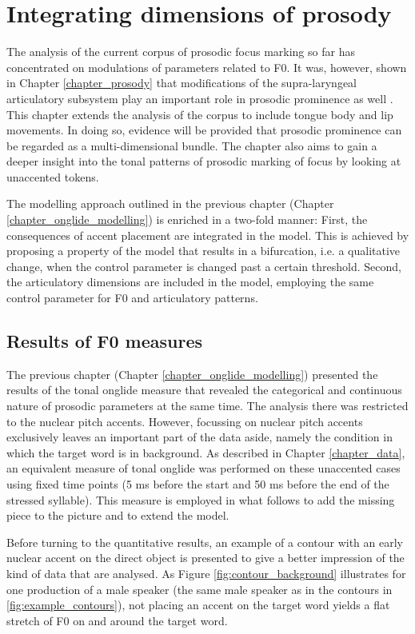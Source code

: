 \chapter{Integrating dimensions of prosody}
\label{chapter_multi_prosody}

The analysis of the current corpus of prosodic focus marking so far has concentrated on modulations of parameters related to F0. It was, however, shown in Chapter \ref{chapter_prosody} that modifications of the supra-laryngeal articulatory subsystem play an important role in prosodic prominence as well \citep{Cho2011, Mücke2018}. This chapter extends the analysis of the corpus to include tongue body and lip movements. In doing so, evidence will be provided that prosodic prominence can be regarded as a multi-dimensional bundle. The chapter also aims to gain a deeper insight into the tonal patterns of prosodic marking of focus by looking at unaccented tokens.

The modelling approach outlined in the previous chapter (Chapter \ref{chapter_onglide_modelling}) is enriched in a two-fold manner: First, the consequences of accent placement are integrated in the model. This is achieved by proposing a property of the model that results in a bifurcation, i.e. a qualitative change, when the control parameter is changed past a certain threshold. Second, the articulatory dimensions are included in the model, employing the same control parameter for F0 and articulatory patterns.

\section{Results of F0 measures}

The previous chapter (Chapter \ref{chapter_onglide_modelling}) presented the results of the tonal onglide measure that revealed the categorical and continuous nature of prosodic parameters at the same time. The analysis there was restricted to the nuclear pitch accents. However, focussing on nuclear pitch accents exclusively leaves an important part of the data aside, namely the condition in which the target word is in background. As described in Chapter \ref{chapter_data}, an equivalent measure of tonal onglide was performed on these unaccented cases using fixed time points (5 ms before the start and 50 ms before the end of the stressed syllable). This measure is employed in what follows to add the missing piece to the picture and to extend the model.

Before turning to the quantitative results, an example of a contour with an early nuclear accent on the direct object is presented to give a better impression of the kind of data that are analysed. As Figure \ref{fig:contour_background} illustrates for one production of a male speaker (the same male speaker as in the contours in \ref{fig:example_contours}), not placing an accent on the target word yields a flat stretch of F0 on and around the target word. 

